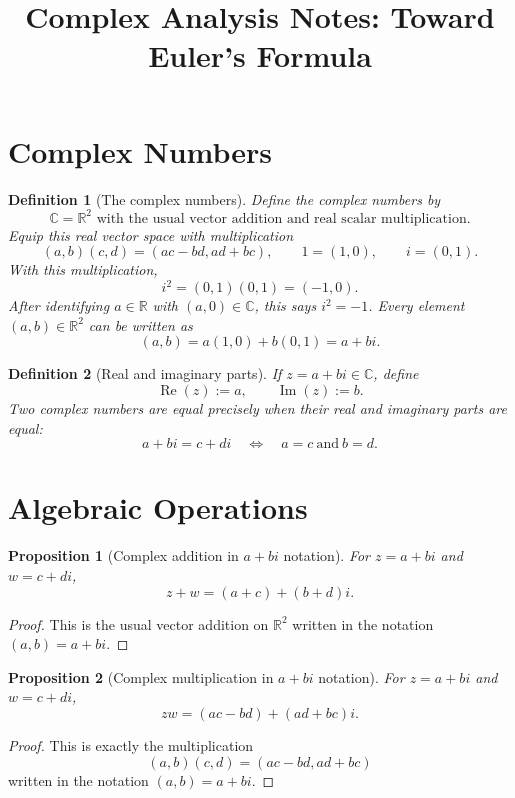 \documentclass[11pt]{article}
\title{Complex Analysis Notes: Toward Euler's Formula}
\author{}
\date{}
\newtheorem{definition}{Definition}[section]
\newtheorem{proposition}{Proposition}[section]
\newcommand{\C}{\mathbb{C}}
\newcommand{\R}{\mathbb{R}}
\newcommand{\Real}{\operatorname{Re}}
\newcommand{\Imag}{\operatorname{Im}}
\begin{document}
\maketitle
\tableofcontents

\section{Complex Numbers}

\begin{definition}[The complex numbers]
Define the complex numbers by
\[
  \boxed{
    \C=\R^{2}
    \text{ with the usual vector addition and real scalar multiplication}
  }.
\]
Equip this real vector space with multiplication
\[
  \boxed{
    (a,b)(c,d)=(ac-bd,ad+bc),
    \qquad
    1=(1,0),
    \qquad
    i=(0,1)
  }.
\]
With this multiplication,
\[
  i^{2}=(0,1)(0,1)=(-1,0).
\]
After identifying $a\in\R$ with $(a,0)\in\C$, this says $i^{2}=-1$.
Every element $(a,b)\in\R^{2}$ can be written as
\[
  (a,b)=a(1,0)+b(0,1)=a+bi.
\]
\end{definition}

\begin{definition}[Real and imaginary parts]
If $z=a+bi\in\C$, define
\[
  \Real(z):=a,
  \qquad
  \Imag(z):=b.
\]
Two complex numbers are equal precisely when their real and imaginary parts are equal:
\[
  a+bi=c+di
  \quad\Longleftrightarrow\quad
  a=c\ \text{and}\ b=d.
\]
\end{definition}

\section{Algebraic Operations}

\begin{proposition}[Complex addition in $a+bi$ notation]
For $z=a+bi$ and $w=c+di$,
\[
  z+w=(a+c)+(b+d)i.
\]
\end{proposition}

\begin{proof}
This is the usual vector addition on $\R^{2}$ written in the notation $(a,b)=a+bi$.
\end{proof}

\begin{proposition}[Complex multiplication in $a+bi$ notation]
For $z=a+bi$ and $w=c+di$,
\[
  zw=(ac-bd)+(ad+bc)i.
\]
\end{proposition}

\begin{proof}
This is exactly the multiplication
\[
  (a,b)(c,d)=(ac-bd,ad+bc)
\]
written in the notation $(a,b)=a+bi$.
\end{proof}
\end{document}
